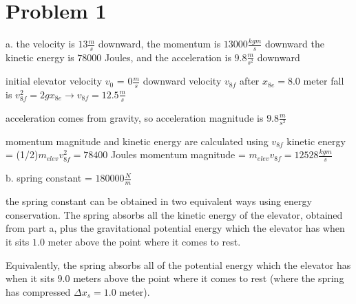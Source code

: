\chapter{Problem 1}
\label{Problem 1}
a. the velocity is $13 \frac{m}{s}$ downward, the momentum is $13000 \frac{kg m}{s}$ downward\newline
   the kinetic energy is $78000$ Joules, and the acceleration is $9.8 \frac{m}{s^{2}}$ downward\newline
                           
initial elevator velocity $v_{0}$ = $0 \frac{m}{s}$\newline
downward velocity $v_{8f}$ after $x_{8e} = 8.0$ meter fall is
$v_{8f}^{2} = 2gx_{8e} \rightarrow v_{8f} = 12.5 \frac{m}{s}$\newline
                                      
acceleration comes from gravity, so acceleration magnitude is $9.8 \frac{m}{s^{2}}$\newline
                                     
momentum magnitude and kinetic energy are calculated using $v_{8f}$\newline
kinetic energy = (1/2)$m_{elev}v_{8f}^{2} = 78400$ Joules\newline
momentum magnitude = $m_{elev}v_{8f} = 12528 \frac{kg m}{s}$\newline
                                                      
b. spring constant = $180000 \frac{N}{m}$\newline
                                                      
the spring constant can be obtained in two equivalent ways using energy conservation.\newline
The spring absorbs all the kinetic energy of the elevator, obtained from part a, plus\newline
the gravitational potential energy which the elevator has when it sits $1.0$ meter\newline
above the point where it comes to rest.\newline
                                            
Equivalently, the spring absorbs all of the potential energy which the elevator has\newline
when it sits $9.0$ meters above the point where it comes to rest (where the spring\newline
has compressed $\Delta x_{s} = 1.0$ meter).\newline
                                                                  
